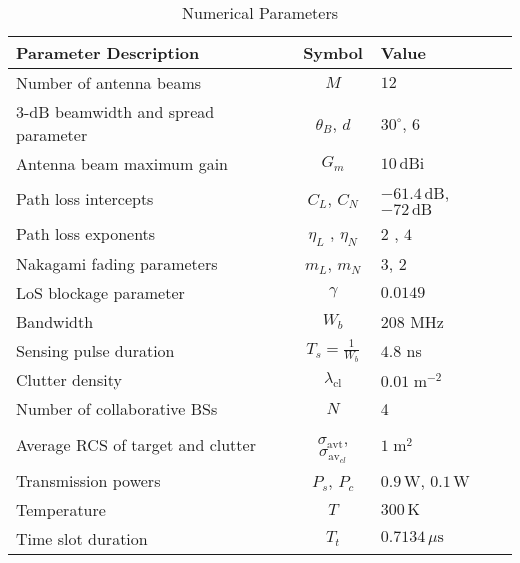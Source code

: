 \documentclass[journal]{IEEEtran}
\begin{document}
\begin{table} 
  \begin{center}
     \caption{ Numerical Parameters}
    \begin{tabular}{l@{}cl}
      \hline
      \textbf{Parameter Description} & \textbf{Symbol} & \textbf{Value} \\
      \hline
Number of antenna beams         & $M$                     & $12$                            \\ 
3-dB beamwidth and   spread parameter            & $\theta_B$,  $d$           & $30^\circ $, 6 \\ 
 Antenna beam maximum gain               & $G_m$                   & $10 \, \text{dBi}$              \\ 
Path loss intercepts                  & $C_L$, $C_N$                      & $-61.4 \, \text{dB}$, $-72 \, \text{dB}$     \cite{yu2017coverage}        \\ 
Path loss exponents       & $\eta_L$   , $\eta_N$                & $2$ , $4$          \cite{yu2017coverage}                     \\ 
Nakagami fading parameters   & $m_L$, $m_N$                   & $3$, $2$     \cite{yu2017coverage}                          \\ 
LoS blockage parameter        & $\gamma$                & $0.0149$      \cite{rebato2019stochastic}                  \\ 
Bandwidth           & $W_b$                      & $208$ MHz    \cite{ram2022estimation}                   \\ 
Sensing pulse duration           & $T_s=\frac{1}{W_b}  $                    & $4.8$ ns                         \\ 
Clutter density                 & $\lambda_{\text{cl}}$   & $0.01\; \text{m}^{-2}$           \cite{ram2022estimation}               \\ 
Number of collaborative BSs       & $N$    &  4\\
Average RCS of target and clutter           & $\sigma_{\text{avt}}$, $\sigma_{\text{av}_{cl}}$   & $1 \; \text{m}^2$     \cite{xiao2022waveform,ram2022estimation}                         \\ 
Transmission powers & $P_s$, $P_c$                   & $0.9 \, \text{W}$, $0.1 \, \text{W}$    \cite{xiao2022waveform}           \\ 
Temperature                     & $T$                     & $300 \, \text{K}$               \\ 
Time slot duration            & $T_t$               &        $0.7134\,\mu\text{s}$    \\ 

\end{tabular}
\end{center}
\end{table}
\end{document}
